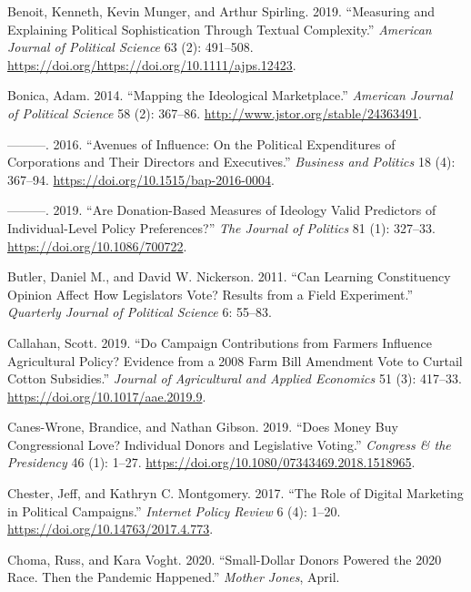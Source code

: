 \documentclass[12pt,]{article}
\begin{document}
\leavevmode\hypertarget{ref-benoit2019}{}%
Benoit, Kenneth, Kevin Munger, and Arthur Spirling. 2019. ``Measuring
and Explaining Political Sophistication Through Textual Complexity.''
\emph{American Journal of Political Science} 63 (2): 491--508.
\url{https://doi.org/https://doi.org/10.1111/ajps.12423}.

\leavevmode\hypertarget{ref-bonica2014}{}%
Bonica, Adam. 2014. ``Mapping the Ideological Marketplace.''
\emph{American Journal of Political Science} 58 (2): 367--86.
\url{http://www.jstor.org/stable/24363491}.

\leavevmode\hypertarget{ref-bonica2016}{}%
---------. 2016. ``Avenues of Influence: On the Political Expenditures
of Corporations and Their Directors and Executives.'' \emph{Business and
Politics} 18 (4): 367--94. \url{https://doi.org/10.1515/bap-2016-0004}.

\leavevmode\hypertarget{ref-bonica2019}{}%
---------. 2019. ``Are Donation-Based Measures of Ideology Valid
Predictors of Individual-Level Policy Preferences?'' \emph{The Journal
of Politics} 81 (1): 327--33. \url{https://doi.org/10.1086/700722}.

\leavevmode\hypertarget{ref-butler2011}{}%
Butler, Daniel M., and David W. Nickerson. 2011. ``Can Learning
Constituency Opinion Affect How Legislators Vote? Results from a Field
Experiment.'' \emph{Quarterly Journal of Political Science} 6: 55--83.

\leavevmode\hypertarget{ref-callahan2019}{}%
Callahan, Scott. 2019. ``Do Campaign Contributions from Farmers
Influence Agricultural Policy? Evidence from a 2008 Farm Bill Amendment
Vote to Curtail Cotton Subsidies.'' \emph{Journal of Agricultural and
Applied Economics} 51 (3): 417--33.
\url{https://doi.org/10.1017/aae.2019.9}.

\leavevmode\hypertarget{ref-caneswrone2019}{}%
Canes-Wrone, Brandice, and Nathan Gibson. 2019. ``Does Money Buy
Congressional Love? Individual Donors and Legislative Voting.''
\emph{Congress \& the Presidency} 46 (1): 1--27.
\url{https://doi.org/10.1080/07343469.2018.1518965}.

\leavevmode\hypertarget{ref-chester2017}{}%
Chester, Jeff, and Kathryn C. Montgomery. 2017. ``The Role of Digital
Marketing in Political Campaigns.'' \emph{Internet Policy Review} 6 (4):
1--20. \url{https://doi.org/10.14763/2017.4.773}.

\leavevmode\hypertarget{ref-choma2020}{}%
Choma, Russ, and Kara Voght. 2020. ``Small-Dollar Donors Powered the
2020 Race. Then the Pandemic Happened.'' \emph{Mother Jones}, April.
\end{document}
